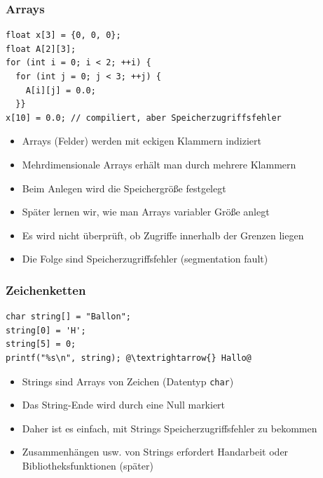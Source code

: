 \documentclass{slides}
\begin{document}
\begin{frame}[fragile]
  \frametitle{Arrays}
\begin{lstlisting}
float x[3] = {0, 0, 0};
float A[2][3];
for (int i = 0; i < 2; ++i) {
  for (int j = 0; j < 3; ++j) {
    A[i][j] = 0.0;
  }}
x[10] = 0.0; // compiliert, aber Speicherzugriffsfehler
\end{lstlisting}

  \begin{itemize}
  \item Arrays (Felder) werden mit eckigen Klammern indiziert
  \item Mehrdimensionale Arrays erhält man durch mehrere Klammern
  \item Beim Anlegen wird die Speichergröße festgelegt
  \item Später lernen wir, wie man Arrays variabler Größe anlegt
  \item Es wird nicht überprüft, ob Zugriffe innerhalb der Grenzen liegen
  \item Die Folge sind Speicherzugriffsfehler (segmentation fault)
  \end{itemize}
\end{frame}

\begin{frame}[fragile]
  \frametitle{Zeichenketten}
  
\begin{lstlisting}
char string[] = "Ballon";
string[0] = 'H';
string[5] = 0;
printf("%s\n", string); @\textrightarrow{} Hallo@
\end{lstlisting}

  \begin{itemize}
  \item Strings sind Arrays von Zeichen (Datentyp \lstinline!char!)
  \item Das String-Ende wird durch eine Null markiert
  \item Daher ist es einfach, mit Strings Speicherzugriffsfehler zu bekommen
  \item Zusammenhängen usw. von Strings erfordert Handarbeit oder Bibliotheksfunktionen (später)
  \end{itemize}

\end{frame}
\end{document}
